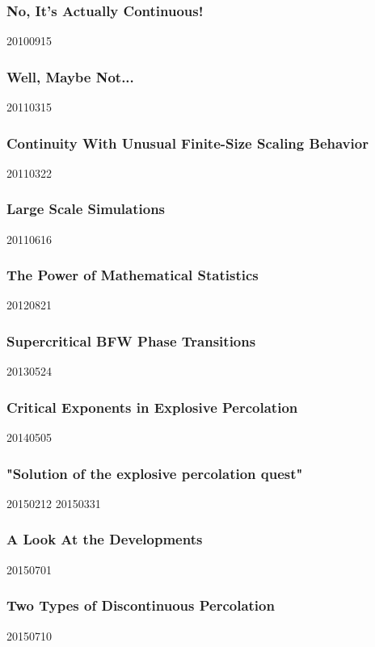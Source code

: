 \subsubsection{No, It's Actually Continuous!}
20100915



\subsubsection{Well, Maybe Not...}
20110315



\subsubsection{Continuity With Unusual Finite-Size Scaling Behavior}
20110322



\subsubsection{Large Scale Simulations}
20110616



\subsubsection{The Power of Mathematical Statistics}
20120821



\subsubsection{Supercritical BFW Phase Transitions}
20130524



\subsubsection{Critical Exponents in Explosive Percolation}
20140505



\subsubsection{"Solution of the explosive percolation quest"}
20150212
20150331



\subsubsection{A Look At the Developments}
20150701



\subsubsection{Two Types of Discontinuous Percolation}
20150710

